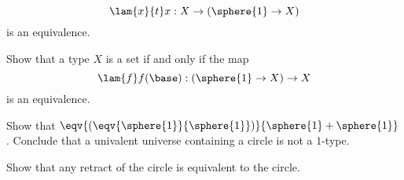 \begin{exercises}
\begin{subexenum}
\begin{equation*}
\lam{x}{t} x : X \to (\sphere{1}\to X)
\end{equation*}
is an equivalence.
\item Show that a type $X$ is a set if and only if the map
\begin{equation*}
\lam{f}f(\base) : (\sphere{1}\to X)\to X
\end{equation*}
is an equivalence.
\end{subexenum}
\item Show that $\eqv{(\eqv{\sphere{1}}{\sphere{1}})}{\sphere{1}+\sphere{1}}$. Conclude that a univalent universe containing a circle is not a $1$-type.
\item Show that any retract of the circle is equivalent to the circle.
\end{exercises}
